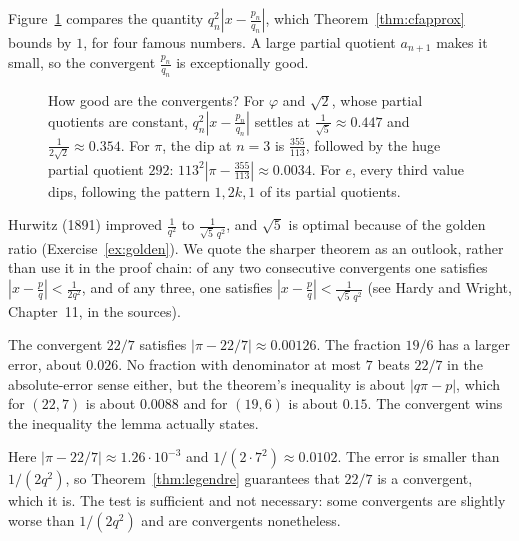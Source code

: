 Figure~\ref{fig:quality} compares the quantity $q_n^2\left|x-\frac{p_n}{q_n}\right|$, which Theorem~\ref{thm:cfapprox} bounds by $1$, for four famous numbers. A large partial quotient $a_{n+1}$ makes it small, so the convergent $\frac{p_n}{q_n}$ is exceptionally good.

\begin{figure}[ht]
\centering
{}
\caption{How good are the convergents? For $\varphi$ and $\sqrt2$, whose partial quotients are constant, $q_n^2\left|x-\frac{p_n}{q_n}\right|$ settles at $\frac1{\sqrt5}\approx0.447$ and $\frac1{2\sqrt2}\approx0.354$. For $\pi$, the dip at $n=3$ is $\frac{355}{113}$, followed by the huge partial quotient $292$: $113^2\left|\pi-\frac{355}{113}\right|\approx0.0034$. For $e$, every third value dips, following the pattern $1,2k,1$ of its partial quotients.}
\label{fig:quality}
\end{figure}

\begin{remark}
Hurwitz (1891) improved $\frac1{q^2}$ to $\frac1{\sqrt5\,q^2}$, and $\sqrt5$ is optimal because of the golden ratio (Exercise~\ref{ex:golden}). We quote the sharper theorem as an outlook, rather than use it in the proof chain: of any two consecutive convergents one satisfies $|x-\frac pq|<\frac1{2q^2}$, and of any three, one satisfies $|x-\frac pq|<\frac1{\sqrt5\,q^2}$ (see Hardy and Wright, Chapter~11, in the sources).
\end{remark}

\begin{examplex}
The convergent $22/7$ satisfies $|\pi-22/7|\approx 0.00126$. The fraction $19/6$ has a larger error, about $0.026$. No fraction with denominator at most $7$ beats $22/7$ in the absolute-error sense either, but the theorem's inequality is about $|q\pi-p|$, which for $(22,7)$ is about $0.0088$ and for $(19,6)$ is about $0.15$. The convergent wins the inequality the lemma actually states.
\end{examplex}

\begin{examplex}
Here $|\pi-22/7|\approx 1.26\cdot 10^{-3}$ and $1/(2\cdot 7^2)\approx 0.0102$. The error is smaller than $1/(2q^2)$, so Theorem~\ref{thm:legendre} guarantees that $22/7$ is a convergent, which it is. The test is sufficient and not necessary: some convergents are slightly worse than $1/(2q^2)$ and are convergents nonetheless.
\end{examplex}

